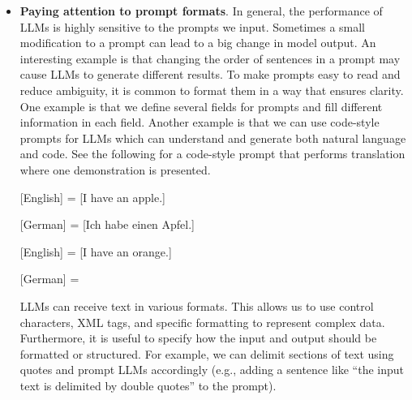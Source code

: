 \begin{itemize}
\item \vspace{0.3em} \textbf{Paying attention to prompt formats}. In general, the performance of LLMs is highly sensitive to the prompts we input. Sometimes a small modification to a prompt can lead to a big change in model output. An interesting example is that changing the order of sentences in a prompt may cause LLMs to generate different results. To make prompts easy to read and reduce ambiguity, it is common to format them in a way that ensures clarity. One example is that we define several fields for prompts and fill different information in each field. Another example is that we can use code-style prompts for LLMs which can understand and generate both natural language and code. See the following for a code-style prompt that performs translation where one demonstration is presented.

    \vspace{0.5em}
    \begin{tcolorbox}

    \begingroup
    \setlength{\leftskip}{2em}
    \setlength{\rightskip}{2em}

    [English] = [I have an apple.]

    \vspace{0.3em}

    [German] = [Ich habe einen Apfel.]

    \vspace{0.3em}

    [English] = [I have an orange.]

    \vspace{0.3em}

    [German] = \underline{\hspace{2em}}

    \endgroup

    \end{tcolorbox}
    \vspace{0.5em}

    LLMs can receive text in various formats. This allows us to use control characters, XML tags, and specific formatting to represent complex data. Furthermore, it is useful to specify how the input and output should be formatted or structured. For example, we can delimit sections of text using quotes and prompt LLMs accordingly (e.g., adding a sentence like ``the input text is delimited by double quotes'' to the prompt).

\end{itemize}
\vspace{0.5em}

